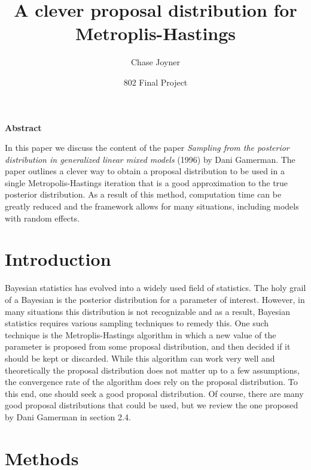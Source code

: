 \documentclass[12pt]{extarticle}
\title{A clever proposal distribution for Metroplis-Hastings}
\author{Chase Joyner}
\date{802 Final Project}
\begin{document}
\maketitle

\begin{center}
\textbf{Abstract}
\end{center}
In this paper we discuss the content of the paper \textit{Sampling from the posterior distribution in generalized linear mixed models} (1996) by Dani Gamerman.  The paper outlines a clever way to obtain a proposal distribution to be used in a single Metropolis-Hastings iteration that is a good approximation to the true posterior distribution.  As a result of this method, computation time can be greatly reduced and the framework allows for many situations, including models with random effects.

\section{Introduction}
Bayesian statistics has evolved into a widely used field of statistics.  The holy grail of a Bayesian is the posterior distribution for a parameter of interest.  However, in many situations this distribution is not recognizable and as a result, Bayesian statistics requires various sampling techniques to remedy this.  One such technique is the Metroplis-Hastings algorithm in which a new value of the parameter is proposed from some proposal distribution, and then decided if it should be kept or discarded.  While this algorithm can work very well and theoretically the proposal distribution does not matter up to a few assumptions, the convergence rate of the algorithm does rely on the proposal distribution.  To this end, one should seek a good proposal distribution.  Of course, there are many good proposal distributions that could be used, but we review the one proposed by Dani Gamerman in section 2.4.


\section{Methods}
\end{document}
